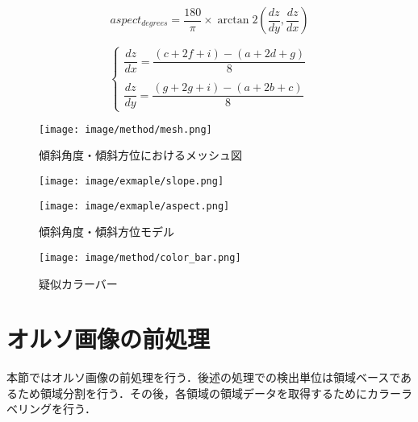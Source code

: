       \begin{equation}
        \label{傾斜方位}
        aspect_{degrees} = 
        \dfrac{180} {\pi} \times
        \arctan 2 (\dfrac{dz}{dy}, \dfrac{dz}{dx})
      \end{equation}

      \begin{equation}
        \label{X方向・Y方向の変化率}
        \left\{
          \begin{array}{l}
            \dfrac{dz}{dx} = 
              \dfrac {(c + 2f + i) - (a + 2d + g)} {8} \\ \\
            \dfrac{dz}{dy} = 
              \dfrac {(g + 2g + i) - (a + 2b + c)} {8}    
          \end{array}
        \right.
      \end{equation}

      \begin{figure}[tbp]
        \centering
        \texttt{[image: image/method/mesh.png]}
        \caption{傾斜角度・傾斜方位におけるメッシュ図}
        \label{メッシュ図}
      \end{figure}
      
      \begin{figure}[tbp]
        \begin{minipage}[c]{0.5\hsize}
          \centering
          \texttt{[image: image/exmaple/slope.png]}
        \end{minipage}
        \begin{minipage}[c]{0.5\hsize}
          \centering
          \texttt{[image: image/exmaple/aspect.png]}
        \end{minipage}
        \caption{傾斜角度・傾斜方位モデル}
        \label{傾斜角度・傾斜方位モデル}
      \end{figure}

      \begin{figure}[tbp]
        \centering
        \texttt{[image: image/method/color\_bar.png]}
        \caption{疑似カラーバー}
        \label{疑似カラーバー}
      \end{figure}


  \section{オルソ画像の前処理}
    本節ではオルソ画像の前処理を行う．後述の処理での検出単位は領域ベースであるため領域分割を行う．その後，各領域の領域データを取得するためにカラーラベリングを行う．


